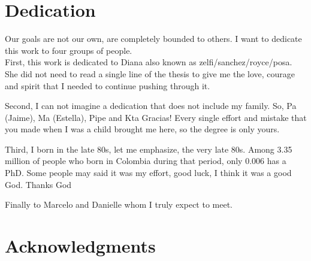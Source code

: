 \documentclass[12pt]{report}
\begin{document}
\chapter*{Dedication}

Our goals are not our own, are completely bounded to others. I want to dedicate this work to four groups of people. \\
First, this work is dedicated to Diana also known as zelfi/sanchez/royce/posa. She did not need to read a single line of the thesis to give me the love, courage and spirit that I needed to continue pushing through it. 

Second, I can not imagine a dedication that does not include my family. So, Pa (Jaime), Ma (Estella), Pipe and Kta Gracias! Every single effort and mistake that you made when I was a child brought me here, so the degree is only yours. 

Third, I born in the late 80s, let me emphasize, the very late 80s. Among 3.35 million of people who born in Colombia during that period, only 0.006 has a PhD. Some people may said it was my effort, good luck, I think it was a good God. Thanks God

Finally to Marcelo and Danielle whom I truly expect to meet.

\chapter*{Acknowledgments}


\end{document}
